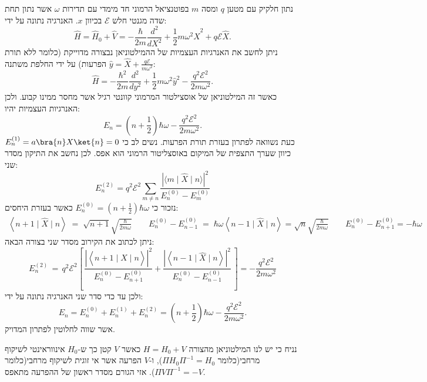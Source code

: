 \documentclass{tstextbook}
\begin{document}
\begin{example}
נתון חלקיק עם מטען \(q\) ומסה \(m\) בפוטנציאל הרמוני חד מימדי עם תדירות \(\omega\) אשר נתון תחת שדה מגנטי חלש \(\mathcal{E}\) בכיוון \(x\). האנרגיה נתונה על ידי:
$$\hat{H}=\hat{H}_{0}+\hat{V}=-\frac{\hbar}{2m}\frac{d^{2}}{d X^{2}}+\frac{1}{2}m\omega^{2}\hat{X}^{2}+q\mathcal{E}\hat{X}.$$
ניתן לחשב את האנרגיות העצמיות של ההמילטוניאן נבצורה מדוייקת (כלומר ללא תורת הפרעות) על ידי החלפת משתנה \(\hat{y}=\hat{X}+\frac{q\mathcal{E}}{m\omega^{2}}\):
$$\hat{H}=-\frac{\hbar^{2}}{2m}\frac{d^{2}}{d y^{2}}+\frac{1}{2}m\omega^{2}\hat{y}^{2}-\frac{q^{2}\mathcal{E}^{2}}{2m\omega^{2}}.$$
כאשר זה המילטוניאן של אוסצילטור המרמוני קוונטי רגיל אשר מחסר ממינו קבוע. ולכן האנרגיות העצמיות יהיו:
$$E_{n}=\left(n+\frac{1}{2}\right)\hbar\omega-\frac{q^{2}\mathcal{E}^{2}}{2m\omega^{2}}.$$
כעת נשוואה לפתרון בעזרת תורת הפרעות. נשים לב כי \(E_{n}^{(1)}=a\bra{n}X\ket{n}=0\) כיוון שערך התצפית של המיקום באוסצליטור הרמוני הוא אפס. לכן נחשב את התיקון מסדר שני:
$$E_{n}^{(2)}=q^{2}\mathcal{E}^{2}\sum_{m\neq n}\frac{\left|\langle m\mid\hat{X}\mid n\rangle\right|^{2}}{E_{n}^{(0)}-E_{m}^{(0)}}$$
נזכור כי \(E_{n}^{(0)}=\left( n+\frac{1}{2} \right)\hbar \omega\) כאשר בעזרת היחסים:
$$\begin{gather}\left\langle  n+1\mid\hat{X}\mid n \right\rangle\;=\;\sqrt{n+1}\sqrt{\frac{\hbar}{2m\omega}}\qquad E_{n}^{(0)}-E_{n-1}^{(0)}\;=\;\hbar\omega\left\langle  n-1\mid\hat{X}\mid n \right\rangle=\sqrt{n}\sqrt{\frac{\hbar}{2m\omega}}\qquad E_{n}^{(0)}-E_{n+1}^{(0)}=-\hbar\omega
\end{gather}$$
ניתן לכתוב את הקירוב מסדר שני בצורה הבאה:
$$E_{n}^{(2)}\,=\,q^{2}{\mathcal E}^{2}\left[\,\frac{|\left\langle  n+1\mid\hat{X}\mid n \right\rangle|^{2}}{E_{n}^{(0)}-E_{n+1}^{(0)}}+\frac{|\left\langle  n-1\mid\hat{X}\mid n \right\rangle|^{2}}{E_{n}^{(0)}-E_{n-1}^{(0)}}\,\right]=-\frac{q^{2}\mathcal{E}^{2}}{2m\omega^{2}}$$
ולכן עד כדי סדר שני האנרגיה נתונה על ידי:
$$E_{n}=E_{n}^{(0)}+E_{n}^{(1)}+E_{n}^{(2)}=\left(n+\frac{1}{2}\right)\hbar\omega-\frac{q^{2}\mathcal{E}^{2}}{2m\omega^{2}}.$$
אשר שווה לחלוטין לפתרון המדויק.

\end{example}
\begin{proposition}
נניח כי יש לנו המילטוניאן מהצורה \(H=H_{0}+V\) כאשר \(V\) קטן כך ש-\(H_{0}\) אינווראינטי לשיקוף מרחבי(כלומר \(\Pi H_{0} \Pi ^{-1}=H_{0}\)), ו-\(V\) הפרעה אשר אי זוגית לשיקוף מרחבי(כלומר \(\Pi V\Pi ^{-1}=-V\)). אזי הגורם מסדר ראשון של ההפרעה מתאפס.

\end{proposition}
\end{document}
